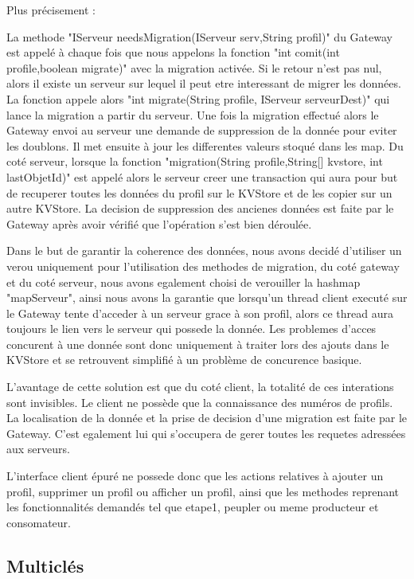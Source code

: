 Plus précisement :

La methode "IServeur needsMigration(IServeur serv,String profil)" du Gateway est appelé à chaque fois que nous appelons la fonction "int comit(int profile,boolean migrate)" avec la migration activée. Si le retour n'est pas nul, alors il existe un serveur sur lequel il peut etre interessant de migrer les données. La fonction appele alors "int migrate(String profile, IServeur serveurDest)" qui lance la migration a partir du serveur.
Une fois la migration effectué alors le Gateway envoi au serveur une demande de suppression de la donnée pour eviter les doublons. Il met ensuite à jour les differentes valeurs stoqué dans les map.
Du coté serveur, lorsque la fonction "migration(String profile,String[] kvstore, int lastObjetId)" est appelé alors le serveur creer une transaction qui aura pour but de recuperer toutes les données du profil sur le KVStore et de les copier sur un autre KVStore. La decision de suppression des ancienes données est faite par le Gateway après avoir vérifié que l'opération s'est bien déroulée.

Dans le but de garantir la coherence des données, nous avons decidé d'utiliser un verou uniquement pour l'utilisation des methodes de migration, du coté gateway et du coté serveur, nous avons egalement choisi de verouiller la hashmap "mapServeur", ainsi nous avons la garantie que lorsqu'un thread client executé sur le Gateway tente d'acceder à un serveur grace à son profil, alors ce thread aura toujours le lien vers le serveur qui possede la donnée. Les problemes d'acces concurent à une donnée sont donc uniquement à traiter lors des ajouts dans le KVStore et se retrouvent simplifié à un problème de concurence basique. 

L'avantage de cette solution est que du coté client, la totalité de ces interations sont invisibles. Le client ne possède que la connaissance des numéros de profils. La localisation de la donnée et la prise de decision d'une migration est faite par le Gateway. C'est egalement lui qui s'occupera de gerer toutes les requetes adressées aux serveurs.

L'interface client épuré ne possede donc que les actions relatives à ajouter un profil, supprimer un profil ou afficher un profil, ainsi que les methodes reprenant les fonctionnalités demandés tel que etape1, peupler ou meme producteur et consomateur.

\subsection {Multiclés}

